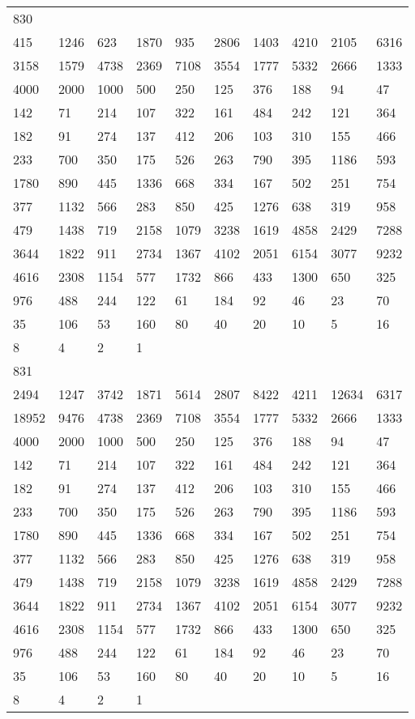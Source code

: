 \begin{longtable}{*{10}{l}}
830&&&&&&&&&\\
415& 1246& 623& 1870& 935& 2806& 1403& 4210& 2105& 6316\\
3158& 1579& 4738& 2369& 7108& 3554& 1777& 5332& 2666& 1333\\
4000& 2000& 1000& 500& 250& 125& 376& 188& 94& 47\\
142& 71& 214& 107& 322& 161& 484& 242& 121& 364\\
182& 91& 274& 137& 412& 206& 103& 310& 155& 466\\
233& 700& 350& 175& 526& 263& 790& 395& 1186& 593\\
1780& 890& 445& 1336& 668& 334& 167& 502& 251& 754\\
377& 1132& 566& 283& 850& 425& 1276& 638& 319& 958\\
479& 1438& 719& 2158& 1079& 3238& 1619& 4858& 2429& 7288\\
3644& 1822& 911& 2734& 1367& 4102& 2051& 6154& 3077& 9232\\
4616& 2308& 1154& 577& 1732& 866& 433& 1300& 650& 325\\
976& 488& 244& 122& 61& 184& 92& 46& 23& 70\\
35& 106& 53& 160& 80& 40& 20& 10& 5& 16\\
8& 4& 2& 1& \\

831&&&&&&&&&\\
2494& 1247& 3742& 1871& 5614& 2807& 8422& 4211& 12634& 6317\\
18952& 9476& 4738& 2369& 7108& 3554& 1777& 5332& 2666& 1333\\
4000& 2000& 1000& 500& 250& 125& 376& 188& 94& 47\\
142& 71& 214& 107& 322& 161& 484& 242& 121& 364\\
182& 91& 274& 137& 412& 206& 103& 310& 155& 466\\
233& 700& 350& 175& 526& 263& 790& 395& 1186& 593\\
1780& 890& 445& 1336& 668& 334& 167& 502& 251& 754\\
377& 1132& 566& 283& 850& 425& 1276& 638& 319& 958\\
479& 1438& 719& 2158& 1079& 3238& 1619& 4858& 2429& 7288\\
3644& 1822& 911& 2734& 1367& 4102& 2051& 6154& 3077& 9232\\
4616& 2308& 1154& 577& 1732& 866& 433& 1300& 650& 325\\
976& 488& 244& 122& 61& 184& 92& 46& 23& 70\\
35& 106& 53& 160& 80& 40& 20& 10& 5& 16\\
8& 4& 2& 1& \\


\end{longtable}
